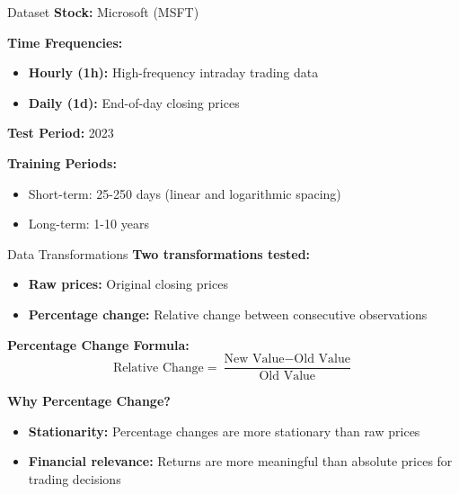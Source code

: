 \documentclass[aspectratio=169]{beamer}
\begin{document}
\begin{frame}{Dataset}
\textbf{Stock:} Microsoft (MSFT)

\vspace{1em}

\textbf{Time Frequencies:}
\begin{itemize}
\item \textbf{Hourly (1h):} High-frequency intraday trading data
\item \textbf{Daily (1d):} End-of-day closing prices
\end{itemize}

\vspace{1em}

\textbf{Test Period:} 2023

\vspace{1em}

\textbf{Training Periods:}
\begin{itemize}
\item Short-term: 25-250 days (linear and logarithmic spacing)
\item Long-term: 1-10 years
\end{itemize}
\end{frame}

\begin{frame}{Data Transformations}
\textbf{Two transformations tested:}
\begin{itemize}
\item \textbf{Raw prices:} Original closing prices
\item \textbf{Percentage change:} Relative change between consecutive observations
\end{itemize}

\vspace{1em}

\textbf{Percentage Change Formula:}
\[
\text{Relative Change} = \frac{\text{New Value} - \text{Old Value}}{\text{Old Value}}
\]

\vspace{1em}

\textbf{Why Percentage Change?}
\begin{itemize}
\item \textbf{Stationarity:} Percentage changes are more stationary than raw prices
\item \textbf{Financial relevance:} Returns are more meaningful than absolute prices for trading decisions
\end{itemize}
\end{frame}
\end{document}
